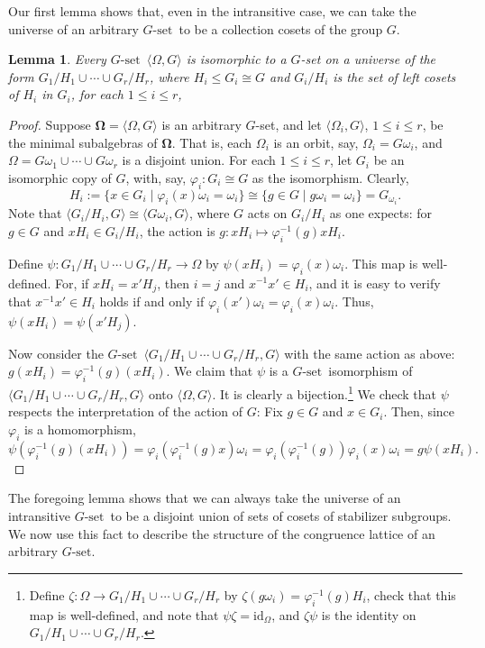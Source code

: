 \documentclass[cm,dissertation,actual,final]{uhthesis}
\theoremstyle{plain}
\newtheorem{lemma}[theorem]{Lemma}
\theoremstyle{definition}
\newcounter{claim}
\theoremstyle{remark}
\numberwithin{theorem}{section}
\numberwithin{claim}{chapter}
\numberwithin{equation}{section}
\numberwithin{conjecture}{chapter}
\newcommand{\<}{\ensuremath{\langle}}
\renewcommand{\>}{\ensuremath{\rangle}}
\renewcommand{\leq}{\ensuremath{\leqslant}}
\newcommand{\0}{\ensuremath{\mathbf{0}}}
\newcommand{\1}{\ensuremath{\mathbf{1}}}
\newcommand{\2}{\ensuremath{\mathbf{2}}}
\newcommand{\3}{\ensuremath{\mathbf{3}}}
\newcommand{\4}{\ensuremath{\mathbf{4}}}
\newcommand{\5}{\ensuremath{\mathbf{5}}}
\newcommand{\Gset}{\ensuremath{G\text{-set}}}
\newcommand{\alg}[1]{\mathbf{#1}}
\newcommand{\la}{\langle}	     %
\newcommand{\ra}{\rangle}	     %
\newcommand{\id}{\ensuremath{\mathrm{id}}}
\renewcommand{\phi}{\ensuremath{\varphi}}
\begin{document}
Our first lemma shows that, even in the intransitive case, we can take the
universe of an arbitrary \Gset\ to be a collection cosets of the group $G$.
\begin{lemma}
\label{lem:intransitive-gsets}
Every \Gset\ $\la \Omega,G\ra$ is isomorphic to a $G$-set on a universe of
the form $G_1/H_1 \cup \cdots \cup G_r/H_r$, where
$H_i \leq G_i\cong G$ and $G_i/H_i$ is the set of left cosets of $H_i$ in $G_i$,
for each $1\leq i\leq r$, 
\end{lemma}
\begin{proof}
Suppose $\alg \Omega = \la \Omega, G\ra$ is an arbitrary $G$-set, and let $\<\Omega_i, G\>$, 
$1 \leq i \leq r$,
be the minimal subalgebras of $\alg \Omega$.  That is, each $\Omega_i$ is an
orbit, say, $\Omega_i = G\omega_i$,  
and $\Omega = G\omega_1 \cup \cdots \cup G\omega_r$ is a disjoint union.
For each $1\leq i \leq r$, let $G_i$ be an isomorphic copy of $G$, with, say,
$\phi_i: G_i\cong G$ as the isomorphism. Clearly,
\[
H_i := \{x \in G_i \mid  \phi_i(x)\omega_i = \omega_i\} \cong \{g\in G \mid
g \omega_i = \omega_i\} = G_{\omega_i}.
\]
Note that $\<G_i/H_i, G\> \cong \<G \omega_i, G\>$, where $G$ acts on $G_i/H_i$ as one
expects: for $g\in G$ and $xH_i\in G_i/H_i$, the action is
$g: xH_i \mapsto \phi_i^{-1}(g)x H_i$. 

Define 
$\psi: G_1/H_1 \cup \cdots \cup G_r/H_r \rightarrow \Omega$
by $\psi(xH_i)  = \phi_i(x)\omega_i$.  This map is well-defined.  For, if 
$xH_i = x'H_j$, then $i=j$ and $x^{-1}x'\in H_i$, and 
it is easy to verify that $x^{-1}x'\in H_i$ holds if and only if $\phi_i(x')\omega_i = \phi_i(x) \omega_i$.
Thus, $\psi(xH_i) = \psi(x'H_j)$.

Now consider the \Gset\ 
$\<G_1/H_1 \cup \cdots \cup G_r/H_r, G\>$ with the same action as above:
$g(xH_i) =\phi_i^{-1}(g)(x H_i)$.   We claim that $\psi$ is a \Gset\ isomorphism of
$\<G_1/H_1 \cup \cdots \cup G_r/H_r, G\>$ onto
$\<\Omega, G\>$.  It is clearly a bijection.\footnote{Define
$\zeta: \Omega \rightarrow 
G_1/H_1 \cup \cdots \cup G_r/H_r$ by 
$\zeta(g\omega_i) = \phi_i^{-1}(g)H_i$, 
check that this map is well-defined, and
note that $\psi \zeta  = \id_\Omega$, and 
$\zeta \psi$ is the identity on $G_1/H_1 \cup \cdots \cup G_r/H_r$.}
We check that $\psi$ respects the
interpretation of the action of $G$:  Fix $g \in G$ and
$x\in G_i$.  Then, since $\phi_i$ is a homomorphism,
\[
\psi (\phi_i^{-1}(g)(x H_i)) = 
\phi_i (\phi_i^{-1}(g)x) \omega_i
= \phi_i (\phi_i^{-1}(g)) \phi_i (x) \omega_i 
= g \psi (x H_i).
\]
\end{proof}
The foregoing lemma shows that we can always take the universe of an
intransitive \Gset\ to be a disjoint union of sets of cosets of stabilizer
subgroups.  We now use this fact to describe the structure of the congruence
lattice of an arbitrary  \Gset.
\end{document}
